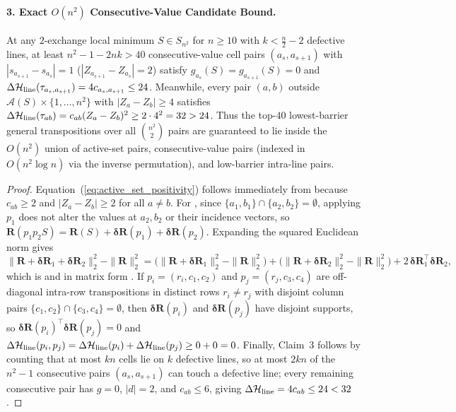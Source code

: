 \begin{theorem}
\paragraph{3. Exact $O(n^2)$ Consecutive-Value Candidate Bound.}
At any $2$-exchange local minimum $S \in S_{n^2}$ for $n \ge 10$ with $k < \frac{n}{2} - 2$ defective lines, at least $n^2 - 1 - 2n k > 40$ consecutive-value cell pairs $(a_s, a_{s+1})$ with $|s_{a_{s+1}} - s_{a_s}| = 1$ ($|Z_{a_{s+1}} - Z_{a_s}| = 2$) satisfy $g_{a_s}(S) = g_{a_{s+1}}(S) = 0$ and $\Delta\mathcal{H}_{\mathrm{line}}(\tau_{a_s, a_{s+1}}) = 4 c_{a_s, a_{s+1}} \le 24$. Meanwhile, every pair $(a,b)$ outside $\mathcal{A}(S)\times\{1,\dots,n^2\}$ with $|Z_a - Z_b| \ge 4$ satisfies $\Delta\mathcal{H}_{\mathrm{line}}(\tau_{ab}) = c_{ab}(Z_a - Z_b)^2 \ge 2 \cdot 4^2 = 32 > 24$. Thus the top-$40$ lowest-barrier general transpositions over all $\binom{n^2}{2}$ pairs are guaranteed to lie inside the $O(n^2)$ union of active-set pairs, consecutive-value pairs (indexed in $O(n^2\log n)$ via the inverse permutation), and low-barrier intra-line pairs.
\end{theorem}

\begin{proof}
Equation~(\ref{eq:active_set_positivity}) follows immediately from  because $c_{ab} \ge 2$ and $|Z_a - Z_b| \ge 2$ for all $a \ne b$. For , since $\{a_1, b_1\} \cap \{a_2, b_2\} = \emptyset$, applying $p_1$ does not alter the values at $a_2, b_2$ or their incidence vectors, so $\mathbf{R}(p_1 p_2 S) = \mathbf{R}(S) + \boldsymbol{\delta R}(p_1) + \boldsymbol{\delta R}(p_2)$. Expanding the squared Euclidean norm gives
\begin{equation*}
  \|\mathbf{R} + \boldsymbol{\delta R}_1 + \boldsymbol{\delta R}_2\|_2^2 - \|\mathbf{R}\|_2^2 = \bigl(\|\mathbf{R} + \boldsymbol{\delta R}_1\|_2^2 - \|\mathbf{R}\|_2^2\bigr) + \bigl(\|\mathbf{R} + \boldsymbol{\delta R}_2\|_2^2 - \|\mathbf{R}\|_2^2\bigr) + 2\,\boldsymbol{\delta R}_1^\top \boldsymbol{\delta R}_2,
\end{equation*}
which is  and in matrix form . If $p_i = (r_i, c_1, c_2)$ and $p_j = (r_j, c_3, c_4)$ are off-diagonal intra-row transpositions in distinct rows $r_i \ne r_j$ with disjoint column pairs $\{c_1, c_2\} \cap \{c_3, c_4\} = \emptyset$, then $\boldsymbol{\delta R}(p_i)$ and $\boldsymbol{\delta R}(p_j)$ have disjoint supports, so $\boldsymbol{\delta R}(p_i)^\top \boldsymbol{\delta R}(p_j) = 0$ and $\Delta\mathcal{H}_{\mathrm{line}}(p_i, p_j) = \Delta\mathcal{H}_{\mathrm{line}}(p_i) + \Delta\mathcal{H}_{\mathrm{line}}(p_j) \ge 0 + 0 = 0$. Finally, Claim~3 follows by counting that at most $k n$ cells lie on $k$ defective lines, so at most $2k n$ of the $n^2-1$ consecutive pairs $(a_s, a_{s+1})$ can touch a defective line; every remaining consecutive pair has $g = 0$, $|d| = 2$, and $c_{ab} \le 6$, giving $\Delta\mathcal{H}_{\mathrm{line}} = 4c_{ab} \le 24 < 32$.
\end{proof}

